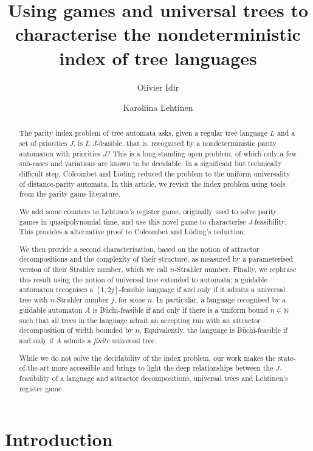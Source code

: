 \documentclass[a4paper,UKenglish,cleveref, autoref, thm-restate]{lipics-v2021}
\title{Using games and universal trees to characterise the nondeterministic index of tree languages}
\author{Olivier Idir}{Université Paris Cité, CNRS, IRIF, France}{olivier.idir@ens-lyon.org}{https://orcid.org/0009-0003-3848-8515}{}
\author{Karoliina Lehtinen}{CNRS, Université Aix-Marseille, LIS, Marseille, France}{karoliina.lehtinen@lis-lab.fr}{https://orcid.org/0000-0003-1171-8790}{}
\newcommand{\NN}{\mathbb{N}}
\newcommand{\A}{{A}}
\begin{document}
	
	\maketitle
	
	\begin{abstract}
	The parity index problem of tree automata asks, given a regular tree language
$L$ and a set of priorities $J$, is $L$ $J$-feasible, that is, recognised by a nondeterministic parity automaton with priorities $J$? This is a long-standing open problem, of which only a few sub-cases
and variations are known to be decidable.
In a significant but technically difficult step, Colcombet and L\"oding reduced the problem to the uniform
universality of distance-parity automata.
In this article, we revisit the index problem using tools from the parity game literature.

We add some counters to Lehtinen's register game, originally used to solve parity games in quasipolynomial time,
and use this novel game to characterise $J$-feasibility. 
This provides a alternative proof to Colcombet and L\"oding's reduction.

We then provide a second characterisation, based on the notion of attractor decompositions and the complexity of their structure, as measured by a parameterised version of their Strahler number, which we call $n$-Strahler number. Finally, we rephrase this result using the notion of universal tree extended to automata: a guidable automaton recognises a $[1,2j]$-feasible language if and only if it admits a universal tree with $n$-Strahler number $j$, for some $n$.
In particular, a language recognised by a guidable automaton $\A$ is B\"uchi-feasible if and only if there is a uniform bound $n\in \NN$ such that all trees in the language admit an accepting run with an attractor decomposition of width bounded by $n$. Equivalently, the language is B\"uchi-feasible if and only if $\A$ admits a \textit{finite} universal tree.

While we do not solve the decidability of the index problem, our work makes the state-of-the-art more accessible and brings to light the deep relationships between the $J$-feasibility of a language and attractor decompositions, universal trees and Lehtinen's register game.  

	\end{abstract}
\section{Introduction}
\end{document}
